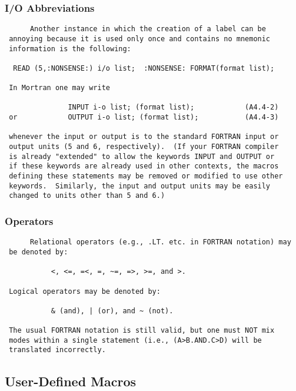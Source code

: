  \subsubsection{I/O Abbreviations}
 \begin{verbatim}
      Another instance in which the creation of a label can be
 annoying because it is used only once and contains no mnemonic
 information is the following:
 
  READ (5,:NONSENSE:) i/o list;  :NONSENSE: FORMAT(format list);
 
 In Mortran one may write
 
               INPUT i-o list; (format list);            (A4.4-2)
 or            OUTPUT i-o list; (format list);           (A4.4-3)
 
 whenever the input or output is to the standard FORTRAN input or
 output units (5 and 6, respectively).  (If your FORTRAN compiler
 is already "extended" to allow the keywords INPUT and OUTPUT or
 if these keywords are already used in other contexts, the macros
 defining these statements may be removed or modified to use other
 keywords.  Similarly, the input and output units may be easily
 changed to units other than 5 and 6.)
 \end{verbatim}
 \subsubsection{Operators}
 \begin{verbatim}
      Relational operators (e.g., .LT. etc. in FORTRAN notation) may
 be denoted by:
 
           <, <=, =<, =, ~=, =>, >=, and >.
 
 Logical operators may be denoted by:
 
           & (and), | (or), and ~ (not).
 
 The usual FORTRAN notation is still valid, but one must NOT mix
 modes within a single statement (i.e., (A>B.AND.C>D) will be
 translated incorrectly.
 \end{verbatim}
 \subsection{User-Defined Macros}

